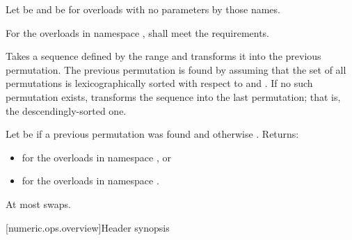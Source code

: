 \begin{itemdescr}
\pnum
Let  be 
and  be 
for overloads with no parameters by those names.

\pnum
\requires
For the overloads in namespace ,
 shall meet
the  requirements.

\pnum
\effects
Takes a sequence defined by the range 
and transforms it into the previous permutation.
The previous permutation is found by assuming that the set of all permutations
is lexicographically sorted with respect to  and .
If no such permutation exists,
transforms the sequence into the last permutation;
that is, the descendingly-sorted one.

\pnum
\returns
Let  be  if a previous permutation was found and
otherwise .
Returns:
\begin{itemize}
\item {} for the overloads in namespace , or
\item {} for the overloads in namespace .
\end{itemize}

\pnum
\complexity
At most  swaps.
\end{itemdescr}

[numeric.ops.overview]{Header  synopsis}

